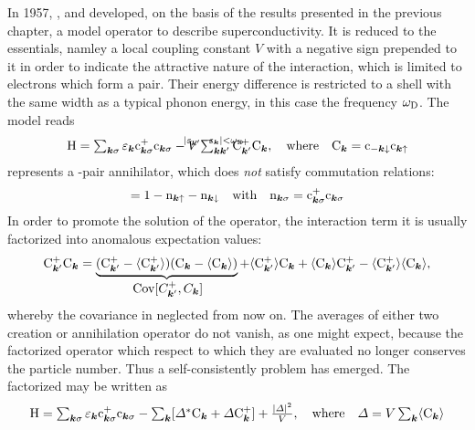 In 1957, ,  and  developed, on the
basis of the results presented in the previous chapter, a model 
operator to describe superconductivity. It is reduced to the essentials, namley
a local coupling constant $V$ with a negative sign prepended to it in order to
indicate the attractive nature of the interaction, which is limited to electrons
which form a  pair. Their energy difference is restricted to a
 shell with the same width as a typical phonon energy, in this case
the  frequency $\omega \sb{\text{D}}$. The model reads
%
\begin{gather*}
    \op H = \sum_{\vec k \sigma}
    \epsilon_{\vec k} \op c_{\vec k \sigma}^+ \op c_{\vec k \sigma}
    -V \sum_{\vec k \vec k'}^{
        \mathclap{|\epsilon_{\vec k'} - \epsilon_{\vec k}| < \omega \sub D}
        }
    \op C_{\vec k'}^+ \op C_{\vec k},
    \quad \text{where} \quad
    \op C_{\vec k} = \op c_{-\vec k \down} \op c_{\vec k \up}
\end{gather*}
%
represents a -pair annihilator, which does \emph{not} satisfy
 commutation relations:
%
\begin{gather*}
    [\op C_{\vec k}, \op C_{\vec k}^+]
    = 1 - \op n_{\vec k \up} - \op n_{\vec k \down}
    \quad \text{with} \quad
    \op n_{\vec k \sigma} = \op c_{\vec k \sigma}^+ \op c_{\vec k \sigma}
\end{gather*}
%
In order to promote the solution of the  operator, the
interaction term it is usually factorized into anomalous expectation values:
%
\begin{align*}
	\op C_{\vec k'}^+ \op C_{\vec k}
    = \hypo{
        (\op C_{\vec k'}^+ - \av{\op C_{\vec k'}^+})
        (\op C_{\vec k} - \av{\op C_{\vec k}})
        }{\Cov[C_{\vec k'}^+, C_{\vec k}]}
    + \av{\op C_{\vec k'}^+} \op C_{\vec k}
    + \av{\op C_{\vec k}} \op C_{\vec k'}^+
    - \av{\op C_{\vec k'}^+} \av{\op C_{\vec k}},
\end{align*}
%
whereby the covariance in neglected from now on. The averages of either two
creation or annihilation operator do not vanish, as one might expect, because
the factorized  operator which respect to which they are
evaluated no longer conserves the particle number. Thus a self-consistently
problem has emerged. The factorized  may be written as
%
\begin{gather*}
    \op H = \sum_{\vec k \sigma}
    \epsilon_{\vec k} \op c_{\vec k \sigma}^+ \op c_{\vec k \sigma} -
    \sum_{\vec k} [\Delta^* \op C_{\vec k} + \Delta \op C_{\vec k}^+]
    + \frac {|\Delta|^2} V,
    \quad \text{where} \quad
    \Delta = V \sum_{\vec k} \av{\op C_{\vec k}}
\end{gather*}

